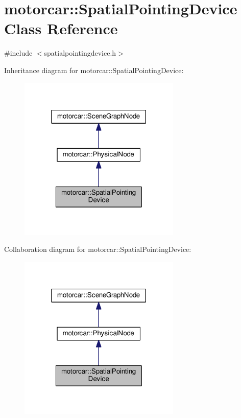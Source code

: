 \hypertarget{classmotorcar_1_1SpatialPointingDevice}{\section{motorcar\-:\-:Spatial\-Pointing\-Device Class Reference}
\label{classmotorcar_1_1SpatialPointingDevice}
}


{\ttfamily \#include $<$spatialpointingdevice.\-h$>$}



Inheritance diagram for motorcar\-:\-:Spatial\-Pointing\-Device\-:
\nopagebreak
\begin{figure}[H]
\begin{center}
\leavevmode
\includegraphics[width=218pt]{classmotorcar_1_1SpatialPointingDevice__inherit__graph}
\end{center}
\end{figure}


Collaboration diagram for motorcar\-:\-:Spatial\-Pointing\-Device\-:
\nopagebreak
\begin{figure}[H]
\begin{center}
\leavevmode
\includegraphics[width=218pt]{classmotorcar_1_1SpatialPointingDevice__coll__graph}
\end{center}
\end{figure}
